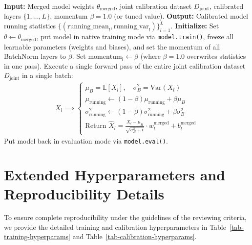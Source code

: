 \documentclass{article}
\theoremstyle{plain}
\theoremstyle{definition}
\theoremstyle{remark}
\begin{document}
\begin{algorithm}[htbp]
\caption{Native Task-Agnostic Activation Calibration (N-TAAC)}
\label{alg:n-taac}
\begin{algorithmic}[1]
\STATE \textbf{Input:} Merged model weights $\theta_{\text{merged}}$, joint calibration dataset $D_{\text{joint}}$, calibrated layers $\{1, \dots, L\}$, momentum $\beta=1.0$ (or tuned value).
\STATE \textbf{Output:} Calibrated model running statistics $\{(\text{running\_mean}_l, \text{running\_var}_l)\}_{l=1}^L$.
\STATE \textbf{Initialize:} Set $\theta \leftarrow \theta_{\text{merged}}$, put model in native training mode via \texttt{model.train()}, freeze all learnable parameters (weights and biases), and set the momentum of all BatchNorm layers to $\beta$.
\STATE Set $\text{momentum}_l \leftarrow \beta$ (where $\beta = 1.0$ overwrites statistics in one pass).
\ENDFOR
\STATE Execute a single forward pass of the entire joint calibration dataset $D_{\text{joint}}$ in a single batch:
\begin{align*}
X_l \implies \begin{cases}
\mu_B = \mathbb{E}[X_l], \quad \sigma_B^2 = \text{Var}(X_l) \\
\mu_{\text{running}} \leftarrow (1-\beta) \mu_{\text{running}} + \beta \mu_B \\
\sigma^2_{\text{running}} \leftarrow (1-\beta) \sigma^2_{\text{running}} + \beta \sigma_B^2 \\
\text{Return } \hat{X}_l = \frac{X_l - \mu_B}{\sqrt{\sigma_B^2 + \epsilon}} \cdot w_l^{\text{merged}} + b_l^{\text{merged}}
\end{cases}
\end{align*}
\STATE Put model back in evaluation mode via \texttt{model.eval()}.
\end{algorithmic}
\end{algorithm}

\newpage
\section{Extended Hyperparameters and Reproducibility Details}
\label{appendix-hyperparameters}

To ensure complete reproducibility under the guidelines of the reviewing criteria, we provide the detailed training and calibration hyperparameters in Table~\ref{tab-training-hyperparams} and Table~\ref{tab-calibration-hyperparams}.
\end{document}
